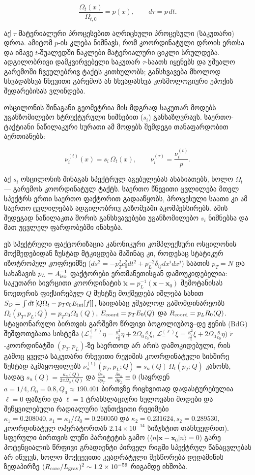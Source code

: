 \documentclass[11pt,a4paper]{article}
\begin{document}
\[
\frac{\Omega_t(x)}{\Omega_{t,0}}=p(x), \qquad d\tau=p\,dt.
\]

აქ $\tau$ მატერიალური პროცესებით აღრიცხული პროცესული (საკუთარი) დროა. ამიტომ $p$-ის კლება ნიშნავს, რომ კოორდინატული დროის ერთსა და იმავე $t$-შუალედში ნაკლები მატერიალური ციკლი სრულდება. ადგილობრივი დამკვირვებელი საკუთარ $\tau$-საათს იყენებს და უშუალო გარემოში ჩვეულებრივ ტაქტს კითხულობს; განსხვავება მხოლოდ სხვადასხვა წნევითი გარემოს ან სხვადასხვა კოსმოლოგიური ეპოქის შედარებისას ვლინდება.

ოსცილონის შინაგანი გეომეტრია მის მდგრად საკუთარ მოდებს უგანზომილებო სტრუქტურული ნიშნებით ($s_i$) განსაზღვრავს. საერთო-ტაქტიანი ნაწილაკური სურათი ამ მოდებს შემდეგი თანაფარდობით აერთიანებს:

\[
\nu_i^{(t)}(x)=s_i\,\Omega_t(x), \qquad
\nu_i^{(\tau)}=\frac{\nu_i^{(t)}}{p}.
\]

აქ $s_i$ ოსცილონის შინაგან სპექტრულ აგებულებას ახასიათებს, ხოლო $\Omega_t$ — გარემოს კოორდინატულ ტაქტს. საერთო წნევითი ცვლილება მთელ სპექტრს ერთი საერთო ფაქტორით გადააწყობს, პროცესული საათი კი ამ საერთო ცვლილებას ადგილობრივ გაზომვაში აკომპენსირებს. ამის შედეგად ნაწილაკთა შორის განსხვავებები უგანზომილებო $s_i$ ნიშნებსა და მათ უცვლელ ფარდობებში ინახება.

ეს სპექტრული ფაქტორიზაცია კანონიკური კომპლექსური ოსცილონის მოქმედებიდან ზუსტად მტკიცდება მაშინაც კი, როდესაც სტატიკურ იზოტროპულ კოფრეიმზე ($ds^2 = -p_T^2 c_0^2 dt^2 + p_L^{-2}\delta_{ij}dx^i dx^j$) საათის $p_T = N$ და სახაზავის $p_L = A_{\rm iso}^{-1}$ ფაქტორები ერთმანეთისგან დამოუკიდებელია: საკუთარი სივრცითი კოორდინატის $\tilde{\mathbf{x}} = p_L^{-1}(\mathbf{x}-\mathbf{x}_0)$ შემოტანისას ნოეთერის ფიქსირებულ $Q$ მუხტზე მოქმედება იშლება სახით $S_O = \int dt\,[Q\Omega_t - p_T c_0 E_{\rm int}[f]]$, საიდანაც უშუალოდ გამომდინარეობს $\Omega_t(p_T, p_L; Q) = p_T c_0\Omega_0(Q)$, $E_{\rm coord} = p_T E_0(Q)$ და $R_{\rm coord} = p_L R_0(Q)$. სტაციონარული ბირთვის გარშემო წრფივი ბოგოლიუბოვ–დე ჟენის (BdG) შეშფოთებათა სისტემა ($\mathcal{L}_+^{(\ell)}\eta = \frac{\kappa^2}{c_0^2}\eta + 2\Omega_0\frac{\kappa}{c_0}\xi$, $\mathcal{L}_-^{(\ell)}\xi = \frac{\kappa^2}{c_0^2}\xi + 2\Omega_0\frac{\kappa}{c_0}\eta$) $\tilde{r}$-კოორდინატში $(p_T, p_L)$-ზე საერთოდ არ არის დამოკიდებული, რის გამოც ყველა საკუთარი რხევითი რეჟიმის კოორდინატული სიხშირე ზუსტად აკმაყოფილებს $\nu_n^{(t)}(p_T, p_L; Q) = s_n(Q)\,\Omega_t(p_T; Q)$ კანონს, სადაც $s_n(Q) = \frac{\kappa_n(Q)}{2\pi\Omega_0(Q)}$ და $\frac{\partial s_n}{\partial p_T} = \frac{\partial s_n}{\partial p_L} \equiv 0$ (საყრდენ $a=1/4, \Omega_0=0.8, Q_0 \approx 190.401$ ბირთვზე რიცხვითად დადასტურებულია $\ell=0$ ფაზური და $\ell=1$ ტრანსლაციური ნულოვანი მოდები და შეწყვილებული რადიალური სუნთქვითი რეჟიმები $\kappa_1 = 0.208040, s_1 = \kappa_1/\Omega_0 = 0.260050$ და $\kappa_2 = 0.231624, s_2 = 0.289530$, კოორდინატულ ოპერატორთან $2.14\times 10^{-14}$ სიზუსტით თანხვედრით). სფერული ბირთვის ლუწი პარიტეტის გამო ($\langle n | \mathbf{x}-\mathbf{x}_0 | n\rangle = 0$) გარე პოტენციალის წრფივი გრადიენტი პირველ რიგში სპექტრულ წანაცვლებას არ იწვევს, ხოლო მოქცევითი კვადრატული შესწორება დედამიწის ზედაპირზე $(R_{\rm core}/L_{\rm grav})^2 \sim 1.2\times 10^{-56}$ რიგამდე იხშობა.
\end{document}
